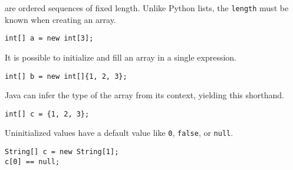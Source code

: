 \begin{blocksection}
 are ordered sequences of fixed length. Unlike Python lists, the
\lstinline$length$ must be known when creating an array.

\begin{lstlisting}
int[] a = new int[3];
\end{lstlisting}

It is possible to initialize and fill an array in a single expression.

\begin{lstlisting}
int[] b = new int[]{1, 2, 3};
\end{lstlisting}

Java can infer the type of the array from its context, yielding this shorthand.

\begin{lstlisting}
int[] c = {1, 2, 3};
\end{lstlisting}

Uninitialized values have a default value like \lstinline$0$,
\lstinline$false$, or \lstinline$null$.

\begin{lstlisting}
String[] c = new String[1];
c[0] == null;
\end{lstlisting}
\end{blocksection}
